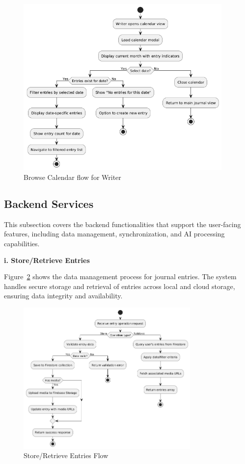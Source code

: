 \begin{figure}[H]
\centering
\includegraphics[width=0.95\textwidth,height=0.7\textheight,keepaspectratio]{files/imgs/browse_calendar_flow.png}
\caption{Browse Calendar flow for Writer}
\label{fig:browse-calendar-flow}
\end{figure}
\clearpage

\subsection{Backend Services}\label{subsec:backendServices}

This subsection covers the backend functionalities that support the user-facing features, including data management, synchronization, and AI processing capabilities.


\textbf{i. Store/Retrieve Entries}

Figure~\ref{fig:store-retrieve-entries-flow} shows the data management process for journal entries. The system handles secure storage and retrieval of entries across local and cloud storage, ensuring data integrity and availability.

\begin{figure}[H]
\centering
\includegraphics[width=0.8\textwidth]{files/imgs/store_retrieve_entries_flow.png}
\caption{Store/Retrieve Entries Flow}
\label{fig:store-retrieve-entries-flow}
\end{figure}
\clearpage

